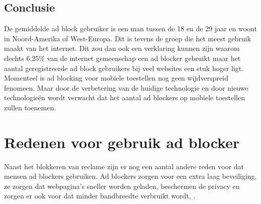 \documentclass[pdftex,a4paper,12pt,twoside]{report}
\begin{document}
\subsection{Conclusie}
\label{sec Conclusie}
De gemiddelde ad block gebruiker is een man tussen de 18 en de 29 jaar en woont in Noord-Amerika of West-Europa. Dit is tevens de groep die het meest gebruik maakt van het internet. Dit zou dan ook een verklaring kunnen zijn waarom slechts 6.25\% van de internet gemeenschap een ad blocker gebruikt maar het aantal geregistreerde ad block gebruikers bij veel websites een stuk hoger ligt. Momenteel is ad blocking voor mobiele toestellen nog geen wijdverspreid fenomeen. Maar door de verbetering van de huidige technologie en door nieuwe technologieën wordt verwacht dat het aantal ad blockers op mobiele toestellen zullen toenemen.

\section{Redenen voor gebruik ad blocker}
\label{sec:Redenen voor gebruik ad blocker}
Naast het blokkeren van reclame zijn er nog een aantal andere reden voor dat mensen ad blockers gebruiken. Ad blockers zorgen voor een extra laag beveiliging, ze zorgen dat webpagina's sneller worden geladen, beschermen de privacy en zorgen er ook voor dat minder bandbreedte verbruikt wordt, \cite{IAB2014}.

\end{document}
